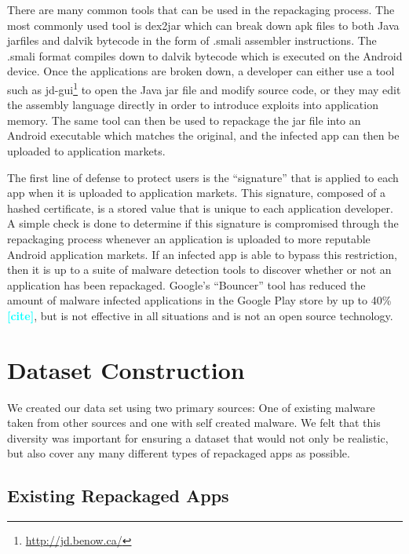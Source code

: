 \documentclass{sig-alternate}
\newcommand{\todo}[1]{\textcolor{cyan}{\textbf{[#1]}}}
\begin{document}
There are many common tools that can be used in the repackaging process. The most commonly used tool is dex2jar which can break down apk files to both Java jarfiles and dalvik bytecode in the form of .smali assembler instructions. The .smali format compiles down to dalvik bytecode which is executed on the Android device. Once the applications are broken down, a developer can either use a tool such as jd-gui\footnote{\url{http://jd.benow.ca/}} to open the Java jar file and modify source code, or they may edit the assembly language directly in order to introduce exploits into application memory. The same tool can then be used to repackage the jar file into an Android executable which matches the original, and the infected app can then be uploaded to application markets.

The first line of defense to protect users is the ``signature'' that is applied to each app when it is uploaded to application markets. This signature, composed of a hashed certificate, is a stored value that is unique to each application developer. A simple check is done to determine if this signature is compromised through the repackaging process whenever an application is uploaded to more reputable Android application markets. If an infected app is able to bypass this restriction, then it is up to a suite of malware detection tools to discover whether or not an application has been repackaged. Google's ``Bouncer'' tool has reduced the amount of malware infected applications in the Google Play store by up to 40\%\todo{cite}, but is not effective in all situations and is not an open source technology.



\section{Dataset Construction}
\label{sec: datasetconstruction}

We created our data set using two primary sources: One of existing malware taken from other sources and one with self created malware. We felt that this diversity was important for ensuring a dataset that would not only be realistic, but also cover any many different types of repackaged apps as possible.



%

\subsection{Existing Repackaged Apps}
\end{document}
